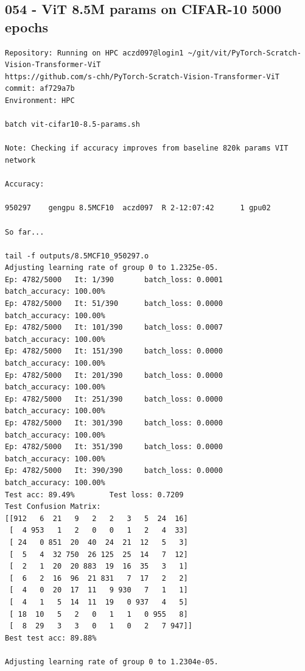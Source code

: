 \subsection{054 - ViT 8.5M params on CIFAR-10 5000 epochs}
\label{app_res:054}
\begin{verbatim}
Repository: Running on HPC aczd097@login1 ~/git/vit/PyTorch-Scratch-Vision-Transformer-ViT
https://github.com/s-chh/PyTorch-Scratch-Vision-Transformer-ViT
commit: af729a7b
Environment: HPC

batch vit-cifar10-8.5-params.sh

Note: Checking if accuracy improves from baseline 820k params VIT network

Accuracy: 

950297    gengpu 8.5MCF10  aczd097  R 2-12:07:42      1 gpu02
            
So far...

tail -f outputs/8.5MCF10_950297.o
Adjusting learning rate of group 0 to 1.2325e-05.
Ep: 4782/5000   It: 1/390       batch_loss: 0.0001      batch_accuracy: 100.00%
Ep: 4782/5000   It: 51/390      batch_loss: 0.0000      batch_accuracy: 100.00%
Ep: 4782/5000   It: 101/390     batch_loss: 0.0007      batch_accuracy: 100.00%
Ep: 4782/5000   It: 151/390     batch_loss: 0.0000      batch_accuracy: 100.00%
Ep: 4782/5000   It: 201/390     batch_loss: 0.0000      batch_accuracy: 100.00%
Ep: 4782/5000   It: 251/390     batch_loss: 0.0000      batch_accuracy: 100.00%
Ep: 4782/5000   It: 301/390     batch_loss: 0.0000      batch_accuracy: 100.00%
Ep: 4782/5000   It: 351/390     batch_loss: 0.0000      batch_accuracy: 100.00%
Ep: 4782/5000   It: 390/390     batch_loss: 0.0000      batch_accuracy: 100.00%
Test acc: 89.49%        Test loss: 0.7209
Test Confusion Matrix:
[[912   6  21   9   2   2   3   5  24  16]
 [  4 953   1   2   0   0   1   2   4  33]
 [ 24   0 851  20  40  24  21  12   5   3]
 [  5   4  32 750  26 125  25  14   7  12]
 [  2   1  20  20 883  19  16  35   3   1]
 [  6   2  16  96  21 831   7  17   2   2]
 [  4   0  20  17  11   9 930   7   1   1]
 [  4   1   5  14  11  19   0 937   4   5]
 [ 18  10   5   2   0   1   1   0 955   8]
 [  8  29   3   3   0   1   0   2   7 947]]
Best test acc: 89.88%

Adjusting learning rate of group 0 to 1.2304e-05.


\end{verbatim}

